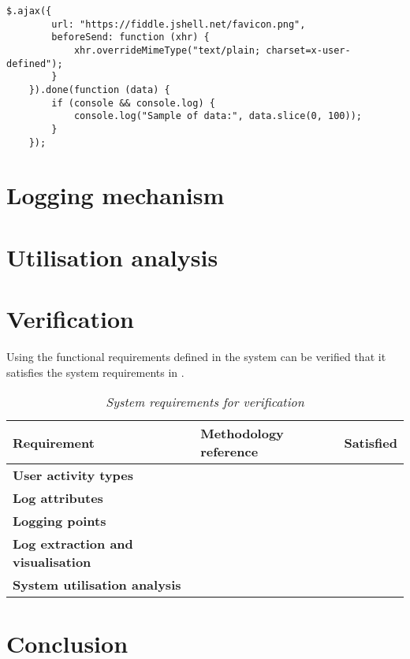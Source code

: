 \begin{lstlisting}[caption={\textit{AJAX request example \cite{API.jQuery2022}}}, label={fig:ch2_ajaxBeforesend}]  
	$.ajax({
		url: "https://fiddle.jshell.net/favicon.png",
		beforeSend: function (xhr) {
			xhr.overrideMimeType("text/plain; charset=x-user-defined");
		}
	}).done(function (data) {
		if (console && console.log) {
			console.log("Sample of data:", data.slice(0, 100));
		}
	});
\end{lstlisting}

\section{Logging mechanism}

\section{Utilisation analysis}


\section{Verification}\label{sec:ch3_verification}
Using the functional requirements defined in  the system can be verified that it satisfies the system requirements in .

\begin{table}[!htb]
	\centering
	\caption[System requirements for verification]
	{\textit{System requirements for verification}}
	\label{tbl:ch2_verification}
	\begin{tabularx}{\textwidth}{|X|X|c|}
		\hline \textbf{Requirement} & \textbf{Methodology reference} & \textbf{Satisfied} \\
		\hline \textbf{User activity types} &  & \cmark \\
		\hline \textbf{Log attributes} & & \cmark \\
		\hline \textbf{Logging points} &  & \cmark \\
		\hline \textbf{Log extraction and visualisation} &  & \cmark \\
		\hline \textbf{System utilisation analysis} &  & \cmark \\
		\hline
	\end{tabularx}
\end{table}

\section{Conclusion}


